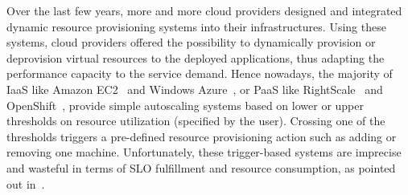 



Over the last few years, more and more cloud providers designed and integrated dynamic resource provisioning systems into their infrastructures.  Using these systems, cloud providers offered the possibility to dynamically provision or deprovision virtual resources to the deployed applications, thus adapting the performance capacity to the service demand. Hence nowadays, the majority of IaaS like Amazon EC2~\cite{amazonEC2} and Windows Azure~\cite{azure-project}, or PaaS like RightScale~\cite{right-scale} and OpenShift~\cite{openshift}, provide simple autoscaling systems based on lower or upper thresholds on resource utilization (specified by the user).  Crossing one of the thresholds triggers a pre-defined resource provisioning action such as adding or removing one machine. Unfortunately, these trigger-based systems are imprecise and wasteful in terms of SLO fulfillment and resource consumption, as pointed out in~\cite{ghanbari_exploring_2011}.






